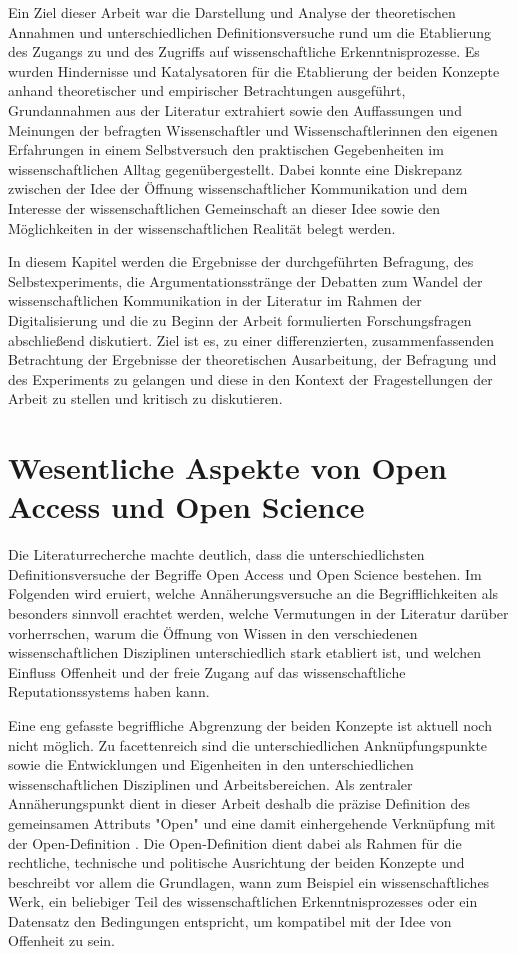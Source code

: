 Ein Ziel dieser Arbeit war die Darstellung und Analyse der theoretischen Annahmen und unterschiedlichen Definitionsversuche rund um die Etablierung des Zugangs zu und des Zugriffs auf wissenschaftliche Erkenntnisprozesse. Es wurden Hindernisse und Katalysatoren für die Etablierung der beiden Konzepte anhand theoretischer und empirischer Betrachtungen ausgeführt, Grundannahmen aus der Literatur extrahiert sowie den Auffassungen und Meinungen der befragten Wissenschaftler und Wissenschaftlerinnen den eigenen Erfahrungen in einem Selbstversuch den praktischen Gegebenheiten im wissenschaftlichen Alltag gegenübergestellt. Dabei konnte eine Diskrepanz zwischen der Idee der Öffnung wissenschaftlicher Kommunikation und dem Interesse der wissenschaftlichen Gemeinschaft an dieser Idee sowie den Möglichkeiten in der wissenschaftlichen Realität belegt werden.

In diesem Kapitel werden die Ergebnisse der durchgeführten Befragung, des Selbstexperiments, die Argumentationsstränge der Debatten zum Wandel der wissenschaftlichen Kommunikation in der Literatur im Rahmen der Digitalisierung und die zu Beginn der Arbeit formulierten Forschungsfragen abschließend diskutiert. Ziel ist es, zu einer differenzierten, zusammenfassenden Betrachtung der Ergebnisse der theoretischen Ausarbeitung, der Befragung und des Experiments zu gelangen und diese in den Kontext der Fragestellungen der Arbeit zu stellen und kritisch zu diskutieren.

\section{Wesentliche Aspekte von Open Access und Open Science}

Die Literaturrecherche machte deutlich, dass die unterschiedlichsten Definitionsversuche der Begriffe Open Access und Open Science bestehen. Im Folgenden wird eruiert, welche Annäherungsversuche an die Begrifflichkeiten als besonders sinnvoll erachtet werden, welche Vermutungen in der Literatur darüber vorherrschen, warum die Öffnung von Wissen in den verschiedenen wissenschaftlichen Disziplinen unterschiedlich stark etabliert ist, und welchen Einfluss Offenheit und der freie Zugang auf das wissenschaftliche Reputationssystems haben kann.

Eine eng gefasste begriffliche Abgrenzung der beiden Konzepte ist aktuell noch nicht möglich. Zu facettenreich sind die unterschiedlichen Anknüpfungspunkte sowie die Entwicklungen und Eigenheiten in den unterschiedlichen wissenschaftlichen Disziplinen und Arbeitsbereichen. Als zentraler Annäherungspunkt dient in dieser Arbeit deshalb die präzise Definition des gemeinsamen Attributs "Open" und eine damit einhergehende Verknüpfung mit der Open-Definition \cite{open_definition}. Die Open-Definition dient dabei als Rahmen für die rechtliche, technische und politische Ausrichtung der beiden Konzepte und beschreibt vor allem die Grundlagen, wann zum Beispiel ein wissenschaftliches Werk, ein beliebiger Teil des wissenschaftlichen Erkenntnisprozesses oder ein Datensatz den Bedingungen entspricht, um kompatibel mit der Idee von Offenheit zu sein.

